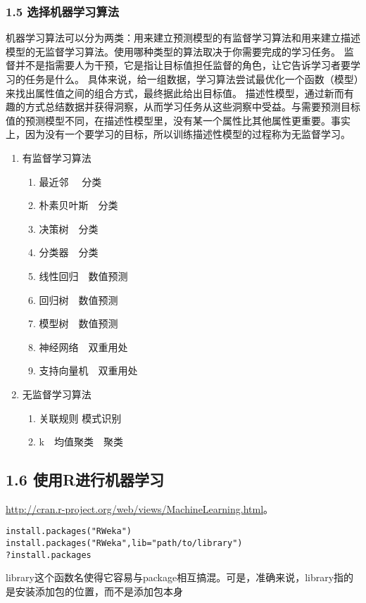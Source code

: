 \documentclass[11pt]{article}
\begin{document}
\subsubsection{1.5 选择机器学习算法}
\label{sec:org336bae2}
机器学习算法可以分为两类：用来建立预测模型的有监督学习算法和用来建立描述模型的无监督学习算法。使用哪种类型的算法取决于你需要完成的学习任务。
监督并不是指需要人为干预，它是指让目标值担任监督的角色，让它告诉学习者要学习的任务是什么。
具体来说，给一组数据，学习算法尝试最优化一个函数（模型）来找出属性值之间的组合方式，最终据此给出目标值。
描述性模型，通过新而有趣的方式总结数据并获得洞察，从而学习任务从这些洞察中受益。与需要预测目标值的预测模型不同，在描述性模型里，没有某一个属性比其他属性更重要。事实上，因为没有一个要学习的目标，所以训练描述性模型的过程称为无监督学习。
\begin{enumerate}
\item 有监督学习算法
\label{sec:org7409d27}
\begin{enumerate}
\item 最近邻 　分类
\label{sec:org6af1609}
\item 朴素贝叶斯　分类
\label{sec:orgae82239}
\item 决策树　分类
\label{sec:org04fa8a7}
\item 分类器　分类
\label{sec:orgca1a959}
\item 线性回归　数值预测
\label{sec:orgbc12c34}
\item 回归树　数值预测
\label{sec:orgc39a2e6}
\item 模型树　数值预测
\label{sec:org0088ea4}
\item 神经网络　双重用处
\label{sec:org39f9767}
\item 支持向量机　双重用处
\label{sec:org9598858}
\end{enumerate}
\item 无监督学习算法
\label{sec:org50bb53b}
\begin{enumerate}
\item 关联规则 模式识别
\label{sec:org0e32641}
\item k　均值聚类　聚类
\label{sec:org29789e4}
\end{enumerate}
\end{enumerate}
\subsection{1.6 使用R进行机器学习}
\label{sec:org254bc4c}
\url{http://cran.r-project.org/web/views/MachineLearning.html}。
\begin{verbatim}
install.packages("RWeka")
install.packages("RWeka",lib="path/to/library")
?install.packages
\end{verbatim}
library这个函数名使得它容易与package相互搞混。可是，准确来说，library指的是安装添加包的位置，而不是添加包本身
\end{document}
